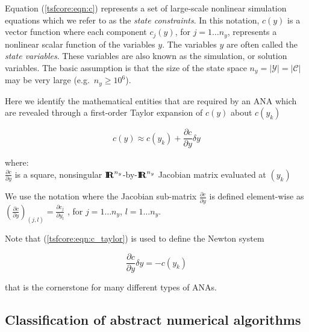 \documentclass[10pt,fleqn]{article}
\begin{document}
Equation (\ref{tsfcore:eqn:c}) represents a set of large-scale
nonlinear simulation equations which we refer to as the \textit{state
constraints}.  In this notation, $c(y)$ is a vector function where
each component $c_j(y)$, for $j = 1 \ldots n_y$, represents a
nonlinear scalar function of the variables $y$.  The variables $y$ are
often called the {\em state variables}.  These variables are also
known as the simulation, or solution variables.  The basic assumption
is that the size of the state space $n_y = |\mathcal{Y}| =
|\mathcal{C}|$ may be very large (e.g.~$n_y \ge 10^{6}$).

Here we identify the mathematical entities that are required by an ANA
which are revealed through a first-order Taylor expansion of $c(y)$
about $c(y_k)$

\begin{equation}
c(y) \approx c(y_k) + \frac{\partial c}{\partial y} \delta y
\label{tsfcore:eqn:c_taylor}
\end{equation}
\begin{tabbing}
\hspace{\mathindent}where:\hspace{5ex}\= \\
\>	$\frac{\partial c}{\partial y}$ is a square, nonsingular $\mbox{\textbf{I}}\hspace{-0.6ex}\mbox{\textbf{R}}^{n_y}$-by-$\mbox{\textbf{I}}\hspace{-0.6ex}\mbox{\textbf{R}}^{n_y}$
    Jacobian matrix evaluated at $(y_k)$
\end{tabbing}

We use the notation where the Jacobian sub-matrix $\frac{\partial
c}{\partial y}$ is defined element-wise as $\left( \frac{\partial
c}{\partial y} \right)_{(j,l)} = \frac{\partial c_j}{\partial y_l}$ ,
for $j = 1 \ldots n_y$, $l = 1 \ldots n_y$.

Note that (\ref{tsfcore:eqn:c_taylor}) is used to define the 
Newton system

\begin{equation}
\frac{\partial c}{\partial y} \delta y = - c(y_k)
\label{tsfcore:eqn:c_newton}
\end{equation}

that is the cornerstone for many different types of ANAs.

%
\subsection{Classification of abstract numerical algorithms}
\label{tsfcore:sec:classification_of_ANAs}
%
\end{document}
